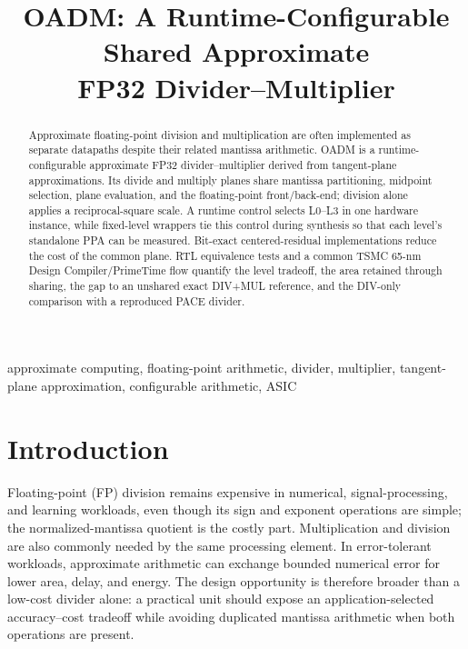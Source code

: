 \documentclass[conference]{IEEEtran}
\title{OADM: A Runtime-Configurable Shared Approximate\\
FP32 Divider--Multiplier}
\author{\IEEEauthorblockN{Pingchuan Dong}
}
\begin{document}
\maketitle

\begin{abstract}
Approximate floating-point division and multiplication are often implemented
as separate datapaths despite their related mantissa arithmetic. OADM is a
runtime-configurable approximate FP32 divider--multiplier derived from
tangent-plane approximations. Its divide and multiply planes share mantissa
partitioning, midpoint selection, plane evaluation, and the floating-point
front/back-end; division alone applies a reciprocal-square scale. A runtime control selects L0--L3 in one hardware instance, while fixed-level
wrappers tie this control during synthesis so that each level's standalone
PPA can be measured. Bit-exact centered-residual
implementations reduce the cost of the common plane. RTL equivalence tests and
a common TSMC 65-nm Design Compiler/PrimeTime flow quantify the level tradeoff,
the area retained through sharing, the gap to an unshared exact DIV+MUL
reference, and the DIV-only comparison with a reproduced PACE divider.
\end{abstract}

\begin{IEEEkeywords}
approximate computing, floating-point arithmetic, divider, multiplier,
tangent-plane approximation, configurable arithmetic, ASIC
\end{IEEEkeywords}

\section{Introduction}
Floating-point (FP) division remains expensive in numerical, signal-processing,
and learning workloads, even though its sign and exponent operations are
simple; the normalized-mantissa quotient is the costly part. Multiplication and
division are also commonly needed by the same processing element. In
error-tolerant workloads, approximate arithmetic can exchange bounded numerical
error for lower area, delay, and energy. The design opportunity is therefore
broader than a low-cost divider alone: a practical unit should expose an
application-selected accuracy--cost tradeoff while avoiding duplicated mantissa
arithmetic when both operations are present.
\end{document}
